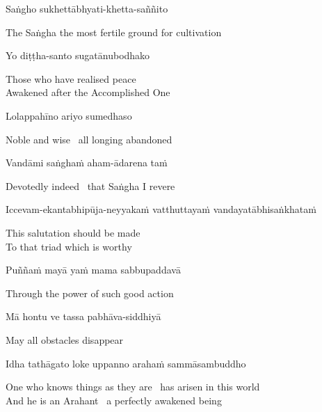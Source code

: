 Saṅgho sukhettābhyati-khetta-saññito

\begin{cprenglish}
  The Saṅgha the most fertile ground for cultivation
\end{cprenglish}

Yo diṭṭha-santo sugatānubodhako

\begin{cprenglish}
  Those who have realised peace\\
  Awakened after the Accomplished One
\end{cprenglish}

Lolappahīno ariyo sumedhaso

\begin{cprenglish}
  Noble and wise \breathmark\ all longing abandoned
\end{cprenglish}

Vandāmi saṅghaṁ aham-ādarena taṁ

\begin{cprenglish}
  Devotedly indeed \breathmark\ that Saṅgha I revere
\end{cprenglish}

Iccevam-ekantabhipūja-neyyakaṁ vatthuttayaṁ vandayatābhisaṅkhataṁ

\begin{cprenglish}
  This salutation should be made\\
  To that triad
  which is worthy
\end{cprenglish}

Puññaṁ mayā yaṁ mama sabbupaddavā

\begin{cprenglish}
  Through the power of such good action
\end{cprenglish}

Mā hontu ve tassa pabhāva-siddhiyā

\begin{cprenglish}
  May all obstacles disappear
\end{cprenglish}

Idha tathāgato loke uppanno arahaṁ sammāsambuddho

\begin{cprenglish}
  One who knows things as they are \breathmark\ has arisen in this world\\
  And he is an Arahant \breathmark\ a perfectly awakened being
\end{cprenglish}

